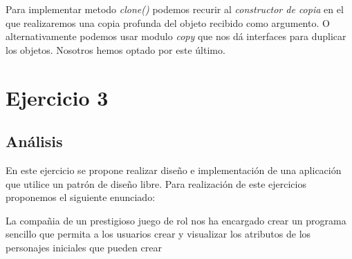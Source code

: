 \documentclass{article}
\begin{document}
Para implementar metodo \textit{clone()} podemos recurir al \textit{constructor de copia} en el que realizaremos una copia profunda del objeto recibido como argumento. O alternativamente podemos usar modulo \textit{copy} que nos dá interfaces para duplicar los objetos. Nosotros hemos optado por este último.


\section{Ejercicio 3}
\subsection{Análisis}
En este ejercicio se propone realizar diseño e implementación de una aplicación que utilice un patrón de diseño libre.
Para realización de este ejercicios proponemos el siguiente enunciado:


La compañia de un prestigioso juego de rol nos ha encargado crear un programa sencillo que permita a los usuarios crear y
visualizar los atributos de los personajes iniciales que pueden crear
\end{document}
